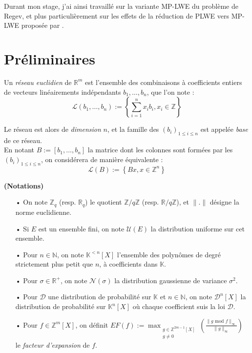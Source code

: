 \documentclass[11pt,a4paper]{article}
\begin{document}
Durant mon stage, j'ai ainsi travaillé sur la variante MP-LWE du problème de Regev, et plus particulièrement sur les effets de la réduction de PLWE vers MP-LWE proposée par \cite{mplwe}.
\\

\section{Préliminaires}
\begin{defin} 
Un \textit{réseau euclidien} de $\mathbb{R}^m$ est l'ensemble des combinaisons à coefficients entiers de vecteurs linéairements indépendants $b_1, \dots, b_n$, que l'on note :
\[\mathcal{L}(b_1,\dots,b_n) := \left\{ \sum_{i=1}^n x_ib_i, x_i \in \mathbb{Z} \right\} \]

Le réseau est alors de \textit{dimension} $n$, et la famille des $(b_i)_{1\leq i \leq n}$ est appelée \textit{base} de ce réseau. \\

En notant $B:=[b_1,\dots,b_n]$ la matrice dont les colonnes sont formées par les $(b_i)_{1\leq i \leq n}$, on considérera de manière équivalente : \[\mathcal{L}(B) := \left\{ Bx, x \in \mathbb{Z}^n \right\} \]
\end{defin}

\begin{defin}\textbf{(Notations)}
\begin{itemize}
\item[•] On note $\mathbb{Z}_q$ (resp. $\mathbb{R}_q$) le quotient $\mathbb{Z}/q\mathbb{Z}$ (resp. $\mathbb{R}/q\mathbb{Z}$), et $\|.\|$ désigne la norme euclidienne.
\item[•] Si $E$ est un ensemble fini, on note $\mathcal{U}(E)$ la distribution uniforme sur cet ensemble.
\item[•] Pour $n\in \mathbb{N}$, on note $\mathbb{K}^{<n}[X]$ l'ensemble des polynômes de degré strictement plus petit que $n$, à coefficients dans $\mathbb{K}$.
\item[•] Pour $\sigma \in \mathbb{R}^+$, on note $\mathcal{N}(\sigma)$ la distribution gaussienne de variance $\sigma^2$.
\item[•] Pour $\mathcal{D}$ une distribution de probabilité sur $\mathbb{K}$ et $n\in \mathbb{N}$, on note $\mathcal{D}^n[X]$ la distribution de probabilité sur $\mathbb{K}^n[X]$ où chaque coefficient suis la loi $\mathcal{D}$.
\item[•] Pour $f \in \mathbb{Z}^m[X]$, on définit $EF(f) :=\displaystyle \max_{\substack{g\in \mathbb{Z}^{2m-1}[X] \\ g \neq 0}}(\frac{\|g\text{ mod }f \|_\infty}{\|g\|_\infty})$ le \textit{facteur d'expansion} de $f$.
\end{itemize}
\end{defin}
\end{document}
